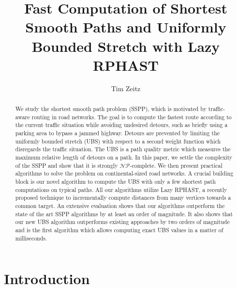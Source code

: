 \documentclass[a4paper,UKenglish,cleveref, autoref, thm-restate]{lipics-v2021}
\title{Fast Computation of Shortest Smooth Paths and Uniformly Bounded Stretch with Lazy RPHAST} %
\author{Tim Zeitz}{Karlsruhe Institute of Technology, Germany}{tim.zeitz@kit.edu}{https://orcid.org/0000-0003-4746-3582}{}%
\begin{document}
\maketitle

\begin{abstract}
We study the shortest smooth path problem (SSPP), which is motivated by traffic-aware routing in road networks.
The goal is to compute the fastest route according to the current traffic situation while avoiding undesired detours, such as briefly using a parking area to bypass a jammed highway.
Detours are prevented by limiting the uniformly bounded stretch (UBS) with respect to a second weight function which disregards the traffic situation.
The UBS is a path quality metric which measures the maximum relative length of detours on a path.
In this paper, we settle the complexity of the SSPP and show that it is strongly $\mathcal{NP}$-complete.
We then present practical algorithms to solve the problem on continental-sized road networks.
A crucial building block is our novel algorithm to compute the UBS with only a few shortest path computations on typical paths.
All our algorithms utilize Lazy RPHAST, a recently proposed technique to incrementally compute distances from many vertices towards a common target.
An extensive evaluation shows that our algorithms outperform the state of the art SSPP algorithms by at least an order of magnitude. %
It also shows that our new UBS algorithm outperforms existing approaches by two orders of magnitude and is the first algorithm which allows computing exact UBS values in a matter of milliseconds.

\end{abstract}

\newpage

\section{Introduction}
\end{document}

